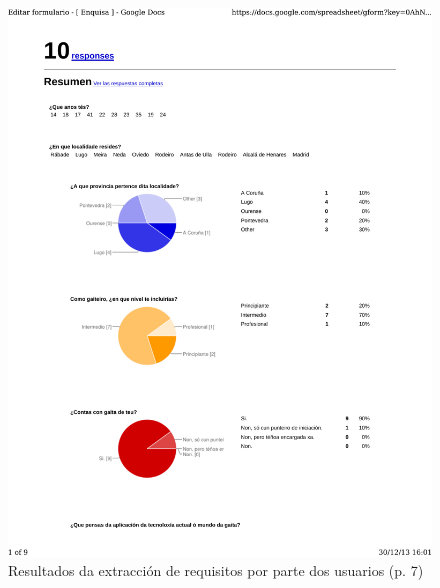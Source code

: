  \begin{figure}[htbp]
   \centering
   \includegraphics[scale=0.7,page=7,keepaspectratio=true]{./imagenes/enquisa.pdf}
   \caption{Resultados da extracción de requisitos por parte dos usuarios (p. 7)}
   \label{figura:ResultadosExtraccionRequisitosUsuarios7}
  \end{figure}

